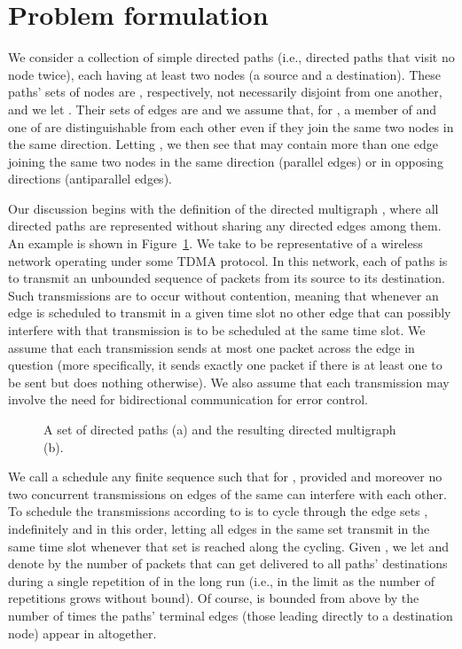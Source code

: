 \documentclass{article}
\begin{document}
\section{Problem formulation}\label{sec:form}

We consider a collection  of
simple directed paths (i.e., directed paths that visit no node twice), each
having at least two nodes (a source and a destination). These paths' sets of
nodes are , respectively, not necessarily disjoint from one
another, and we let . Their sets of edges are
 and we assume that, for , a member of  and
one of  are distinguishable from each other even if they join the same two
nodes in the same direction. Letting , we then see that
 may contain more than one edge joining the same two nodes in the same
direction (parallel edges) or in opposing directions (antiparallel edges).

Our discussion begins with the definition of the directed multigraph
, where all  directed paths are represented without sharing any
directed edges among them. An example is shown in Figure~\ref{fig1}. We take
 to be representative of a wireless network operating under some TDMA
protocol. In this network, each of paths
 is to transmit an unbounded
sequence of packets from its source to its destination. Such transmissions are
to occur without contention, meaning that whenever an edge is scheduled to
transmit in a given time slot no other edge that can possibly interfere with
that transmission is to be scheduled at the same time slot. We assume that each
transmission sends at most one packet across the edge in question (more
specifically, it sends exactly one packet if there is at least one to be sent
but does nothing otherwise). We also assume that each transmission may involve
the need for bidirectional communication for error control.

\begin{figure}[t]
\centering
{}
\caption{A set of  directed paths (a) and the resulting directed multigraph
 (b).}
\label{fig1}
\end{figure}

We call a schedule any finite sequence
 such that
 for , provided
 and moreover no two concurrent transmissions on
edges of the same  can interfere with each other. To schedule the
transmissions according to  is to cycle through the edge sets
, indefinitely and in this order, letting all edges in
the same set transmit in the same time slot whenever that set is reached along
the cycling. Given , we let  and
denote by  the number of packets that can get
delivered to all paths' destinations during a single repetition of 
in the long run (i.e., in the limit as the number of repetitions grows without
bound). Of course,  is bounded from above by
the number of times the  paths' terminal edges (those leading directly to a
destination node) appear in  altogether.
\end{document}
